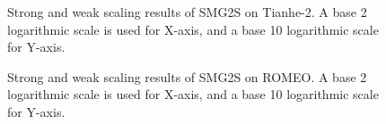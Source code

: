 \begin{figure}[htbp]
	\centering
	\caption{Strong and weak scaling results of SMG2S on Tianhe-2. A base 2 logarithmic scale is used for X-axis, and a base 10 logarithmic scale for Y-axis. }
	\label{fig:scaling-cpu-tianhe-2}
\end{figure}

\begin{figure}[htbp]
	\centering
	\caption{Strong and weak scaling results of SMG2S on ROMEO. A base 2 logarithmic scale is used for X-axis, and a base 10 logarithmic scale for Y-axis. }
	\label{fig:scaling-cpu-romeo}
\end{figure}

